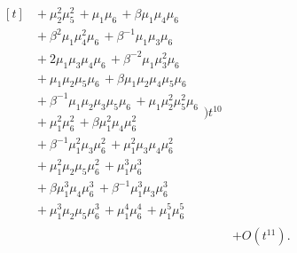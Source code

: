 \documentclass[10pt]{article}
\begin{document}
\[\begin{aligned}
\begin{aligned}[t]
  &{}+\mu_2^{2}\mu_5^{2}\,+\mu_1\mu_6\,+\beta\mu_1\mu_4\mu_6 \\
  &{}+\beta^{2}\mu_1\mu_4^{2}\mu_6\,+\beta^{-1}\mu_1\mu_3\mu_6 \\
  &{}+2\mu_1\mu_3\mu_4\mu_6\,+\beta^{-2}\mu_1\mu_3^{2}\mu_6 \\
  &{}+\mu_1\mu_2\mu_5\mu_6\,+\beta\mu_1\mu_2\mu_4\mu_5\mu_6 \\
  &{}+\beta^{-1}\mu_1\mu_2\mu_3\mu_5\mu_6\,+\mu_1\mu_2^{2}\mu_5^{2}\mu_6 \\
  &{}+\mu_1^{2}\mu_6^{2}\,+\beta\mu_1^{2}\mu_4\mu_6^{2} \\
  &{}+\beta^{-1}\mu_1^{2}\mu_3\mu_6^{2}\,+\mu_1^{2}\mu_3\mu_4\mu_6^{2} \\
  &{}+\mu_1^{2}\mu_2\mu_5\mu_6^{2}\,+\mu_1^{3}\mu_6^{3} \\
  &{}+\beta\mu_1^{3}\mu_4\mu_6^{3}\,+\beta^{-1}\mu_1^{3}\mu_3\mu_6^{3} \\
  &{}+\mu_1^{3}\mu_2\mu_5\mu_6^{3}\,+\mu_1^{4}\mu_6^{4}\,+\mu_1^{5}\mu_6^{5}\end{aligned}\Bigr)t^{10} \\
  &+ O(t^{11}).
\end{aligned}
\]
\end{document}
